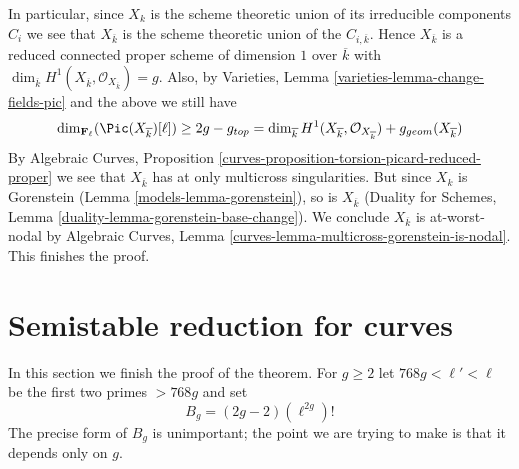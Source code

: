 \medskip\noindent
In particular, since $X_k$ is the scheme theoretic union of its
irreducible components $C_i$ we see that $X_{\overline{k}}$ is the
scheme theoretic union of the $C_{i, \overline{k}}$.
Hence $X_{\overline{k}}$ is a reduced connected proper
scheme of dimension $1$ over $\overline{k}$ with $\dim_{\overline{k}}
H^1(X_{\overline{k}}, \mathcal{O}_{X_{\overline{k}}}) = g$.
Also, by Varieties, Lemma \ref{varieties-lemma-change-fields-pic}
and the above we still have
$$
\dim_{\mathbf{F}_\ell}(\Pic(X_{\overline{k}})[\ell])
\geq 2g - g_{top} =
\dim_{\overline{k}} H^1(X_{\overline{k}}, \mathcal{O}_{X_{\overline{k}}})
+ g_{geom}(X_{\overline{k}})
$$
By Algebraic Curves, Proposition
\ref{curves-proposition-torsion-picard-reduced-proper}
we see that $X_{\overline{k}}$ has at only multicross singularities.
But since $X_k$ is Gorenstein (Lemma \ref{models-lemma-gorenstein}),
so is $X_{\overline{k}}$ (Duality for Schemes, Lemma
\ref{duality-lemma-gorenstein-base-change}).
We conclude $X_{\overline{k}}$ is at-worst-nodal by
Algebraic Curves, Lemma \ref{curves-lemma-multicross-gorenstein-is-nodal}.
This finishes the proof.

\section{Semistable reduction for curves}
\label{models-section-semistable-reduction-theorem}
In this section we finish the proof of the theorem.
For $g \geq 2$ let $768g < \ell' < \ell$
be the first two primes $> 768g$ and set
\begin{equation}
\label{equation-bound}
B_g = (2g - 2)(\ell^{2g})!
\end{equation}
The precise form of $B_g$ is unimportant; the point we are trying
to make is that it depends only on $g$.

